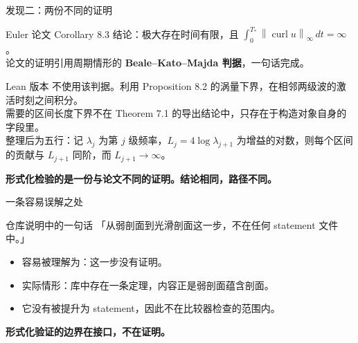 \documentclass[aspectratio=169,11pt,fontset=windows]{ctexbeamer}
\newcommand{\norm}[1]{\left\lVert #1\right\rVert}
\newcommand{\curl}{\operatorname{curl}}
\begin{document}
\begin{frame}{发现二：两份不同的证明}
  \small
  \begin{block}{Euler 论文 Corollary 8.3}
    \footnotesize
    结论：极大存在时间有限，且 $\int_0^{T_*}\norm{\curl u}_\infty\,dt=\infty$。\\[1pt]
    论文的证明引用周期情形的 \textbf{Beale--Kato--Majda 判据}，一句话完成。
  \end{block}

  \begin{block}{Lean 版本}
    \footnotesize
    不使用该判据。利用 Proposition 8.2 的涡量下界，在相邻两级波的激活时刻之间积分。\\[1pt]
    需要的区间长度下界不在 Theorem 7.1 的导出结论中，只存在于构造对象自身的字段里。\\[1pt]
    整理后为五行：记 $\lambda_j$ 为第 $j$ 级频率，$L_j=4\log\lambda_{j+1}$ 为增益的对数，则每个区间的贡献与 $L_{j+1}$ 同阶，而 $L_{j+1}\to\infty$。
  \end{block}

  \vspace{1mm}
  \centering
  \footnotesize
  \textbf{形式化检验的是一份与论文不同的证明。结论相同，路径不同。}
\end{frame}

\begin{frame}{一条容易误解之处}
  \small
  \begin{block}{仓库说明中的一句话}
    \footnotesize
    「从弱剖面到光滑剖面这一步，不在任何 statement 文件中。」
  \end{block}

  \begin{itemize}
    \setlength{\itemsep}{3pt}
    \item 容易被理解为：这一步没有证明。
    \item 实际情形：库中存在一条定理，内容正是弱剖面蕴含剖面。
    \item 它没有被提升为 statement，因此不在比较器检查的范围内。
  \end{itemize}

  \vspace{3mm}
  \centering
  \textbf{形式化验证的边界在接口，不在证明。}
\end{frame}
\end{document}
